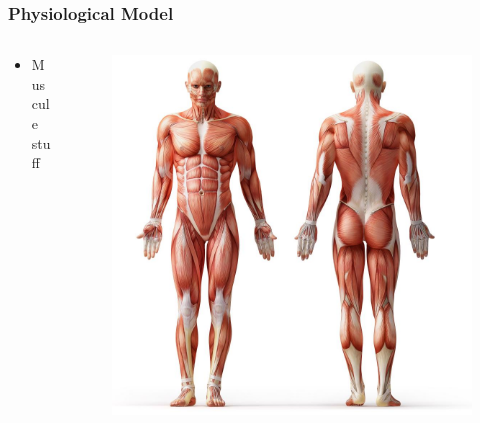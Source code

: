 \documentclass{beamer}
\begin{document}
\begin{frame}
\frametitle{Physiological Model}

\begin{columns}
  \begin{column}{0.6\textwidth}
    \begin{itemize}
    \item Muscule stuff
    \end{itemize}
  \end{column}
  
  \begin{column}{0.4\textwidth}
    \begin{figure}[ht!]
      \includegraphics[scale=0.12]{physiological.jpg}
    \end{figure} 
  \end{column}
\end{columns}

\end{frame}
\end{document}
